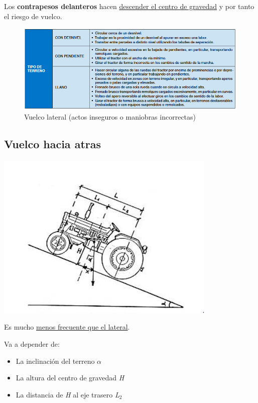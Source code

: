 \documentclass[a4paper,12pt,oneside]{book}
\begin{document}
Los \textbf{contrapesos delanteros} hacen \uline{descender el centro de gravedad} y por tanto
el riesgo de vuelco.
\begin{figure}[htbp]
\centering
\includegraphics[width=\textwidth]{./img_0009/vuelco_lat.PNG}
\caption{Vuelco lateral (actos inseguros o maniobras incorrectas)}
\end{figure}
\subsection{Vuelco hacia atras}
\label{sec:orgd4dfce5}

\begin{center}
\includegraphics[width=.9\linewidth]{./img_0009/vuelco_atras_graf.PNG}
\end{center}

Es mucho \uline{menos frecuente que el lateral}.

Va a depender de:
\begin{itemize}
\item La inclinación del terreno \(\alpha\)
\item La altura del centro de gravedad \emph{H}
\item La distancia de \emph{H} al eje trasero \emph{L\(_{\text{2}}\)}
\end{itemize}
\end{document}

